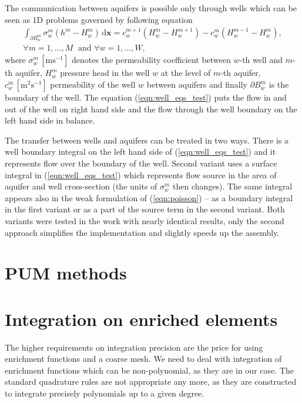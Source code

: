 \documentclass[preprint,12pt,authoryear]{elsarticle}
\begin{document}
The communication between aquifers is possible only through wells which can be seen as 1D problems governed by following equation
\begin{eqnarray} 
\int_{\partial{}B_w^m}\sigma_w^m \left(h^m - H_w^m\right) \, \mathrm{d}\mathbf{x} = c_w^{m+1}\left( H^m_w-H_w^{m+1}\right) - c^m_w\left( H^{m-1}_w-H^m_w \right),
\label{eqn:well_eqs_test} \\
 \forall m=1,\dots,M \;\textrm{ and } \forall w=1,\dots,W, \nonumber
\end{eqnarray}
where $\sigma^m_w\, [\textrm{m}\textrm{s}^{-1}]$ denotes the permeability coefficient between $w$-th well and $m$-th aquifer, 
$H_w^m$ pressure head in the well $w$ at the level of $m$-th aquifer, $c^m_w\, [\textrm{m}^2\textrm{s}^{-1}]$ 
permeability of the well $w$ between aquifers and finally $\partial{}B^m_w$ is the boundary of the well.
The equation (\ref{eqn:well_eqs_test}) puts the flow in and out of the well on right hand side and the flow through
the well boundary on the left hand side in balance.

The transfer between wells and aquifers can be treated in two ways. There is a well boundary integral on the left hand side of (\ref{eqn:well_eqs_test}) 
and it represents flow over the boundary of the well. Second variant uses a surface integral in (\ref{eqn:well_eqs_test}) which represents flow source
in the area of aquifer and well cross-section (the units of $\sigma^m_w$ then changes). The same integral appears also in the weak formulation 
of (\ref{eqn:poisson}) -- as a boundary integral in the first variant or as a part of the source term in the second variant.
Both variants were tested in the work with nearly identical results, only the second approach simplifies the implementation and slightly speeds up the assembly.



\section{PUM methods}
\label{sec:pum_methods}

\section{Integration on enriched elements}
\label{sec:integration}

The higher requirements on integration precision
are the price for using enrichment functions and a coarse mesh.
We need to deal with integration of enrichment functions which can be non-polynomial, as they are in our case. 
The standard quadrature rules are not appropriate any more, as they are constructed to integrate precisely 
polynomials up to a given degree. 
\end{document}
